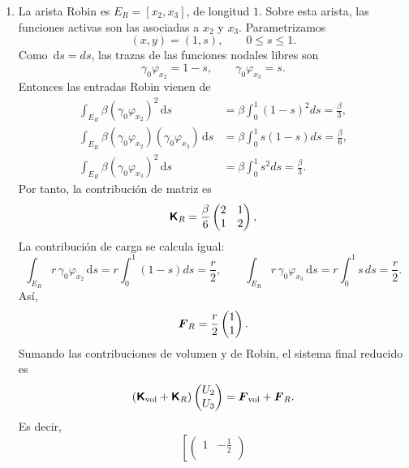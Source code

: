 \documentclass[11pt]{article}
\def\mat   #1{\mbox{\boldmath $\mathsf #1$}}
\def\vec   #1{\mbox{\boldmath $#1$}{}}
\def\ds{\mbox{\(\,\mathrm{d}s\)}}
\begin{document}
\begin{enumerate}[label=\textbf{\arabic*.}, leftmargin=*]
\begin{enumerate}[label=(\alph*)]
        \item La arista Robin es $E_R=[x_2,x_3]$, de longitud $1$. Sobre esta arista, las funciones activas son las asociadas a $x_2$ y $x_3$. Parametrizamos
        \[
            (x,y)=(1,s),
            \qquad
            0\le s\le1.
        \]
        Como $\ds=ds$, las trazas de las funciones nodales libres son
        \[
            \gamma_0\varphi_{x_2}=1-s,
            \qquad
            \gamma_0\varphi_{x_3}=s.
        \]
        Entonces las entradas Robin vienen de
        \[
        \begin{aligned}
            \int_{E_R}\beta(\gamma_0\varphi_{x_2})^2\ds
            &=\beta\int_0^1(1-s)^2ds=\frac{\beta}{3},\\
            \int_{E_R}\beta(\gamma_0\varphi_{x_2})(\gamma_0\varphi_{x_3})\ds
            &=\beta\int_0^1s(1-s)ds=\frac{\beta}{6},\\
            \int_{E_R}\beta(\gamma_0\varphi_{x_3})^2\ds
            &=\beta\int_0^1s^2ds=\frac{\beta}{3}.
        \end{aligned}
        \]
        Por tanto, la contribución de matriz es
        \[
            \mat K_R=
            \frac{\beta}{6}
            \begin{pmatrix}
                2&1\\
                1&2
            \end{pmatrix},
        \]
        La contribución de carga se calcula igual:
        \[
            \int_{E_R}r\,\gamma_0\varphi_{x_2}\ds
            =
            r\int_0^1(1-s)ds
            =
            \frac r2,
            \qquad
            \int_{E_R}r\,\gamma_0\varphi_{x_3}\ds
            =
            r\int_0^1s\,ds
            =
            \frac r2.
        \]
        Así,
        \[
            \vec F_R=
            \frac{r}{2}
            \begin{pmatrix}
                1\\1
            \end{pmatrix}.
        \]
        Sumando las contribuciones de volumen y de Robin, el sistema final reducido es
        \[
            (\mat K_{\mathrm{vol}}+\mat K_R)
            \begin{pmatrix}
                U_2\\U_3
            \end{pmatrix}
            =
            \vec F_{\mathrm{vol}}+\vec F_R.
        \]
        Es decir,
        \[
            \left[
            \begin{pmatrix}
                1&-\frac12\\[0.3ex]

\end{pmatrix}\]
\end{enumerate}
\end{enumerate}
\end{document}
